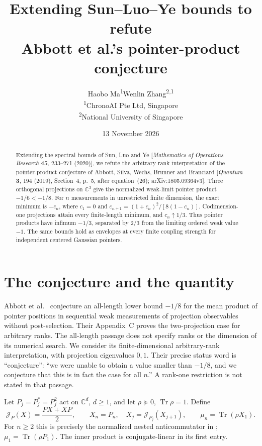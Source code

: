\documentclass[11pt,a4paper]{article}
\title{Extending Sun--Luo--Ye bounds to refute\\Abbott et al.'s pointer-product conjecture}
\author{Haobo Ma\textsuperscript{1}\qquad Wenlin Zhang\textsuperscript{2,1}\\[4pt]
\small\textsuperscript{1}ChronoAI Pte Ltd, Singapore\\
\small\textsuperscript{2}National University of Singapore}
\date{13 November 2026}
\newcommand{\tr}{\operatorname{Tr}}
\newcommand{\J}{\mathcal J}
\begin{document}
\maketitle
\begin{abstract}
Extending the spectral bounds of Sun, Luo and Ye
[\emph{Mathematics of Operations Research} \textbf{45}, 233--271 (2020)],
we refute the arbitrary-rank interpretation of the pointer-product conjecture
of Abbott, Silva, Wechs, Brunner and Branciard
[\emph{Quantum} \textbf{3}, 194 (2019), Section~4, p.~5, after equation~(26);
arXiv:1805.09364v3]. Three orthogonal projections on $\mathbb C^3$
give the normalized weak-limit pointer product $-1/6<-1/8$.
For $n$ measurements in unrestricted finite dimension, the exact minimum is
$-c_n$, where $c_1=0$ and $c_{n+1}=(1+c_n)^2/[8(1-c_n)]$.
Codimension-one projections attain every finite-length minimum, and
$c_n\uparrow1/3$. Thus pointer products have infimum $-1/3$, separated
by $2/3$ from the limiting ordered weak value $-1$.
The same bounds hold as envelopes at every finite coupling strength
for independent centered Gaussian pointers.
\end{abstract}

\section{The conjecture and the quantity}

Abbott et al.\ \cite[Section~4, p.~5, paragraph following (26)]{abbott}
conjecture an all-length lower bound $-1/8$ for the mean product of pointer
positions in sequential weak measurements of projection observables without
post-selection. Their Appendix~C proves the two-projection case for arbitrary
ranks. The all-length passage does not specify ranks or the dimension of its
numerical search. We consider its finite-dimensional arbitrary-rank
interpretation, with projection eigenvalues $0,1$.
Their precise status word is ``conjecture'': ``we were unable to obtain a
value smaller than $-1/8$, and we conjecture that this is in fact the case
for all $n$.'' A rank-one restriction is not stated in that passage.

Let $P_j=P_j^*=P_j^2$ act on $\mathbb C^d$, $d\geq1$, and let
$\rho\succeq0$, $\tr\rho=1$. Define
\begin{equation}\label{eq:quantity}
 \J_P(X)=\frac{PX+XP}{2},\qquad
 X_n=P_n,\quad X_j=\J_{P_j}(X_{j+1}),\qquad
 \mu_n=\tr(\rho X_1).
\end{equation}
For $n\geq2$ this is precisely the normalized nested anticommutator in
\cite[equation (A42), p.~14]{abbott}; $\mu_1=\tr(\rho P_1)$.
The inner product is conjugate-linear in its first entry.
\end{document}
